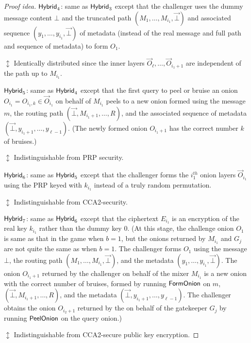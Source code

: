 \documentclass[runningheads,a4paper]{llncs}
\begin{document}
\begin{proof}[Proof idea]
\noindent $\mathsf{Hybrid}_{4}$: same as $\mathsf{Hybrid}_{3}$ except that the challenger uses the dummy message content $\bot$ and the truncated path $(M_1, \dots, M_{i_1}, \vec{\bot})$ and associated sequence $(y_1, \dots, y_{i_1}, \vec{\bot})$ of metadata (instead of the real message and full path and sequence of metadata) to form $O_1$.

    \textcolor{hybrid}{$\updownarrow$ Identically distributed since the inner layers $\vec{O}_\ell, \dots, \vec{O}_{i_1+1}$ are independent of the path up to $M_{i_1}$.} 

\noindent $\mathsf{Hybrid}_{5}$: same as $\mathsf{Hybrid}_{4}$ except that the first query to peel or bruise an onion $O_{i_1} = O_{i_1, k} \in \vec{O}_{i_1}$ on behalf of $M_{i_1}$ peels to a new onion formed using the message $m$, the routing path $(\vec{\bot}, M_{i_1+1}, \dots, R)$, and the associated sequence of metadata $(\vec{\bot}, y_{i_1+1}, \dots, y_{\ell-1})$. (The newly formed onion $O_{i_1+1}$ has the correct number $k$ of bruises.)

    \textcolor{hybrid}{$\updownarrow$ Indistinguishable from PRP security.}

\noindent $\mathsf{Hybrid}_{6}$: same as $\mathsf{Hybrid}_{5}$ except that the challenger forms the $i_1^\mathit{th}$ onion layers $\vec{O}_{i_1}$ using the PRP keyed with $k_{i_1}$ instead of a truly random permutation. 

    \textcolor{hybrid}{$\updownarrow$ Indistinguishable from CCA2-security.}

\noindent $\mathsf{Hybrid}_{7}$: same as $\mathsf{Hybrid}_{6}$ except that the ciphertext $E_{i_1}$ is an encryption of the real key $k_{i_1}$ rather than the dummy key $0$. (At this stage, the challenge onion $O_1$ is same as that in the game when $b=1$, but the onions returned by $M_{i_1}$ and $G_j$ are not quite the same as when $b=1$. The challenger forms $O_1$ using the message $\bot$, the routing path $(M_1, \dots, M_{i_1}, \vec{\bot})$, and the metadata $(y_1, \dots, y_{i_1}, \vec{\bot})$. The onion $O_{i_1+1}$ returned by the challenger on behalf of the mixer $M_{i_1}$ is a new onion with the correct number of bruises, formed by running $\mathsf{FormOnion}$ on $m$, $(\vec{\bot}, M_{i_1+1}, \dots, R)$, and the metadata $(\vec{\bot}, y_{i_1+1}, \dots, y_{\ell-1})$. The challenger obtains the onion $O_{i_2+1}$ returned by the on behalf of the gatekeeper $G_{j}$ by running $\mathsf{PeelOnion}$ on the query onion.)

    \textcolor{hybrid}{$\updownarrow$ Indistinguishable from CCA2-secure public key encryption.}


\end{proof}
\end{document}
